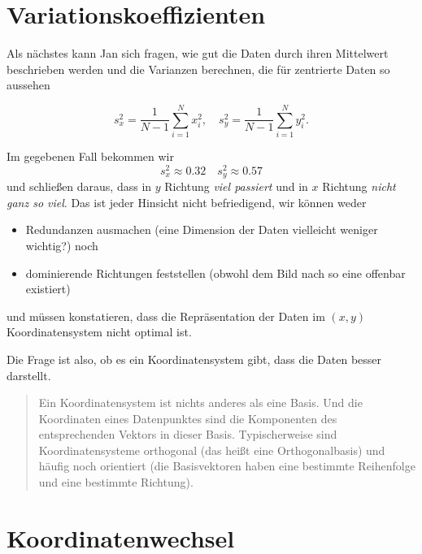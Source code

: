 \documentclass[]{book}
\providecommand{\tightlist}{%
  \setlength{\itemsep}{0pt}\setlength{\parskip}{0pt}}
\newenvironment {JHSAYS} [0] {\begin{quote}\color{jhsc}} {\end{quote}}
\theoremstyle{definition}
\theoremstyle{definition}
\theoremstyle{definition}
\theoremstyle{definition}
\theoremstyle{remark}
\begin{document}
\hypertarget{variationskoeffizienten}{%
\section{Variationskoeffizienten}\label{variationskoeffizienten}}

Als nächstes kann Jan sich fragen, wie gut die Daten durch ihren Mittelwert beschrieben werden und die Varianzen berechnen, die für zentrierte Daten so aussehen

\begin{equation*}
s_x^2 = \frac {1}{N-1} \sum_{i=1}^N x_i^2,
\quad
s_y^2 = \frac {1}{N-1} \sum_{i=1}^N y_i^2.
\end{equation*}

Im gegebenen Fall bekommen wir
\begin{equation*}
s_x^2 \approx 0.32
\quad
s_y^2 \approx  0.57
\end{equation*}
und schließen daraus, dass in \(y\) Richtung \emph{viel passiert} und in \(x\) Richtung \emph{nicht ganz so viel}. Das ist jeder Hinsicht nicht befriedigend, wir können weder

\begin{itemize}
\tightlist
\item
  Redundanzen ausmachen (eine Dimension der Daten vielleicht weniger wichtig?) noch
\item
  dominierende Richtungen feststellen (obwohl dem Bild nach so eine offenbar existiert)
\end{itemize}

und müssen konstatieren, dass die Repräsentation der Daten im \((x,y)\) Koordinatensystem nicht optimal ist.

Die Frage ist also, ob es ein Koordinatensystem gibt, dass die Daten besser darstellt.

\leavevmode\hypertarget{rem-coors}{}%
\begin{JHSAYS}
Ein Koordinatensystem ist nichts anderes als eine Basis. Und die Koordinaten eines Datenpunktes sind die Komponenten des entsprechenden Vektors in dieser Basis. Typischerweise sind Koordinatensysteme orthogonal (das heißt eine Orthogonalbasis) und häufig noch orientiert (die Basisvektoren haben eine bestimmte Reihenfolge und eine bestimmte Richtung).

\end{JHSAYS}

\hypertarget{koordinatenwechsel}{%
\section{Koordinatenwechsel}\label{koordinatenwechsel}}
\end{document}

